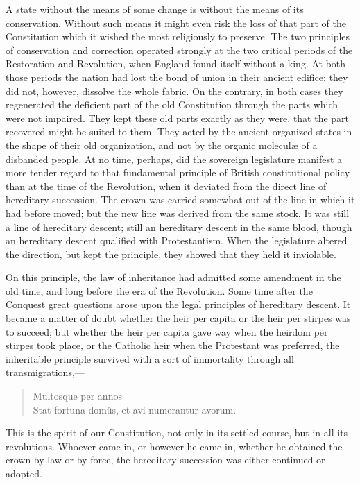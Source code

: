 A state without the means of some change is without the means of its conservation. Without such means it might even risk the loss of that part of the Constitution which it wished the most religiously to preserve. The two principles of conservation and correction operated strongly at the two critical periods of the Restoration and Revolution, when England found itself without a king. At both those periods the nation had lost the bond of union in their ancient edifice: they did not, however, dissolve the whole fabric. On the contrary, in both cases they regenerated the deficient part of the old Constitution through the parts which were not impaired. They kept these old parts exactly as they were, that the part recovered might be suited to them. They acted by the ancient organized states in the shape of their old organization, and not by the organic moleculæ of a disbanded people. At no time, perhaps, did the sovereign legislature manifest a more tender regard to that fundamental principle of British constitutional policy than at the time of the Revolution, when it deviated from the direct line of hereditary succession. The crown was carried somewhat out of the line in which it had before moved; but the new line was derived from the same stock. It was still a line of hereditary descent; still an hereditary descent in the same blood, though an hereditary descent qualified with Protestantism. When the legislature altered the direction, but kept the principle, they showed that they held it inviolable.

On this principle, the law of inheritance had admitted some amendment in the old time, and long before the era of the Revolution. Some time after the Conquest great questions arose upon the legal principles of hereditary descent. It became a matter of doubt whether the heir per capita or the heir per stirpes was to succeed; but whether the heir per capita gave way when the heirdom per stirpes took place, or the Catholic heir when the Protestant was preferred, the inheritable principle survived with a sort of immortality through all transmigrations,—

\begin{verse}
\hspace{1.5in}Multosque per annos\\
Stat fortuna domûs, et avi numerantur avorum.
\end{verse}

This is the spirit of our Constitution, not only in its settled course, but in all its revolutions. Whoever came in, or however he came in, whether he obtained the crown by law or by force, the hereditary succession was either continued or adopted.

